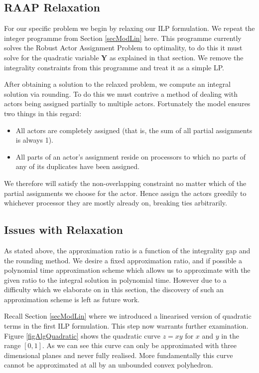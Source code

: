 \subsection{RAAP Relaxation}

For our specific problem we begin by relaxing our ILP formulation.
We repeat the integer programme from Section \ref{secModLin} here.
This programme currently solves the Robust Actor Assignment Problem to optimality, to do this it must solve for the quadratic variable $\mathbf{Y}$ as explained in that section.
We remove the integrality constraints from this programme and treat it as a simple LP.



After obtaining a solution to the relaxed problem, we compute an integral solution via rounding.
To do this we must contrive a method of dealing with actors being assigned partially to multiple actors.
Fortunately the model ensures two things in this regard:
\begin{itemize}
	\item All actors are completely assigned (that is, the sum of all partial assignments is always 1).
	\item All parts of an actor's assignment reside on processors to which no parts of any of its duplicates have been assigned.
\end{itemize}
\noindent We therefore will satisfy the non-overlapping constraint no matter which of the partial assignments we choose for the actor.
Hence assign the actors greedily to whichever processor they are mostly already on, breaking ties arbitrarily.

\subsection{Issues with Relaxation}

As stated above, the approximation ratio is a function of the integrality gap and the rounding method.
We desire a fixed approximation ratio, and if possible a polynomial time approximation scheme which allows us to approximate with the given ratio to the integral solution in polynomial time.
However due to a difficulty which we elaborate on in this section, the discovery of such an approximation scheme is left as future work.

Recall Section \ref{secModLin} where we introduced a linearised version of quadratic terms in the first ILP formulation.
This step now warrants further examination.
Figure \ref{figAlgQuadratic} shows the quadratic curve $z=xy$ for $x$ and $y$ in the range $[0,1]$.
As we can see this curve can only be approximated with three dimensional planes and never fully realised.
More fundamentally this curve cannot be approximated at all by an unbounded convex polyhedron.

